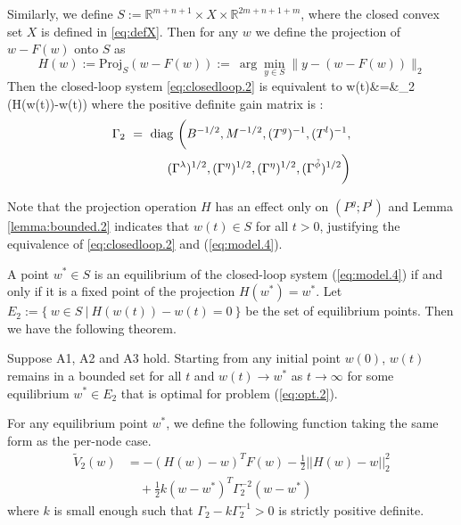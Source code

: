         
       Similarly, we define 
        $
        S   :=  \mathbb R^{m+n+1}\times X \times \mathbb R^{2m+n+1+m}
        $, where the closed convex set $X$ is defined in \eqref{eq:defX}.
         Then for any $w$ we define the projection of $w-F(w)$ onto  $S$ as  
$$H(w) :=  \text{Proj}_S (w-F(w)) := \ \arg\min_{y\in S} \| y - (w-F(w)) \|_2 $$
Then the closed-loop system \eqref{eq:closedloop.2} is equivalent to 
\bq
\label{eq:model.4}
\dot w(t)&=&\Gamma_2 (H(w(t))-w(t))
\eq
where the positive definite gain matrix is :
\begin{align}
	\Gamma_2\  =\ \mathrm{diag}\ \bigg(B^{-1/2}, M^{-1/2}, (T^g)^{-1},  (T^l)^{-1},\nonumber\\
	 (\Gamma^{\lambda})^{1/2}, (\Gamma^{\eta})^{1/2}, (\Gamma^{\eta})^{1/2}, (\Gamma^{\tilde \phi})^{1/2} \bigg) \nonumber
\end{align}

Note that the projection operation $H$ has an effect only on $(P^g; P^l)$ and Lemma \ref{lemma:bounded.2} indicates that $w(t )\in  S$ for all $t>0$, justifying the equivalence of \eqref{eq:closedloop.2} and (\ref{eq:model.4}).

A point $w^*\in S$ is an equilibrium of the closed-loop system (\ref{eq:model.4}) if and only if it is a fixed point of the projection
$H(w^*)=w^*$. 
Let $E_2:=\{\ w\in S\ |\ H(w(t))-w(t)=0\ \}$ be the set of equilibrium points. Then we have the following theorem.

\begin{theorem}
	\label{thm:stability.22}
	Suppose A1, A2 and A3 hold.
	Starting from any initial point $w(0)$, 
	$w(t)$ remains in a bounded set for all $t$ 
	and $w(t)\rightarrow w^*$ as $t\rightarrow\infty$ for some equilibrium $w^*\in E_2$ that
	is optimal for problem (\ref{eq:opt.2}).
\end{theorem}

For any equilibrium point $w^*$, we define the following  function taking the same form as the per-node case.
\begin{align}
	\label{eq:lyapunov.2}
	\tilde{V}_2(w)&=-(H(w)-w)^TF(w)
	-\frac{1}{2} ||H(w)-w||^2_2 \nonumber\\
	&\quad +\frac{1}{2}k(w-w^*)^T\Gamma_2^{-2}(w-w^*) 
\end{align}
where   $k$ is small enough such that $\Gamma_2-k\Gamma_2^{-1} > 0$ is strictly positive definite. 

